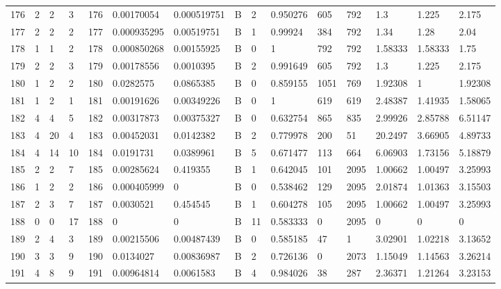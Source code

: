 \begin{latin}
\begin{longtable}{lllllllllllllll}
	176 & 2  & 2   & 3  & 176 & 0.00170054     & 0.000519751    & B & 2  & 0.950276 & 605  & 792  & 1.3     & 1.225   & 2.175   \\
	177 & 2  & 2   & 2  & 177 & 0.000935295    & 0.00519751     & B & 1  & 0.99924  & 384  & 792  & 1.34    & 1.28    & 2.04    \\
	178 & 1  & 1   & 2  & 178 & 0.000850268    & 0.00155925     & B & 0  & 1        & 792  & 792  & 1.58333 & 1.58333 & 1.75    \\
	179 & 2  & 2   & 3  & 179 & 0.00178556     & 0.0010395      & B & 2  & 0.991649 & 605  & 792  & 1.3     & 1.225   & 2.175   \\
	180 & 1  & 2   & 2  & 180 & 0.0282575      & 0.0865385      & B & 0  & 0.859155 & 1051 & 769  & 1.92308 & 1       & 1.92308 \\
	181 & 1  & 2   & 1  & 181 & 0.00191626     & 0.00349226     & B & 0  & 1        & 619  & 619  & 2.48387 & 1.41935 & 1.58065 \\
	182 & 4  & 4   & 5  & 182 & 0.00317873     & 0.00375327     & B & 0  & 0.632754 & 865  & 835  & 2.99926 & 2.85788 & 6.51147 \\
	183 & 4  & 20  & 4  & 183 & 0.00452031     & 0.0142382      & B & 2  & 0.779978 & 200  & 51   & 20.2497 & 3.66905 & 4.89733 \\
	184 & 4  & 14  & 10 & 184 & 0.0191731      & 0.0389961      & B & 5  & 0.671477 & 113  & 664  & 6.06903 & 1.73156 & 5.18879 \\
	185 & 2  & 2   & 7  & 185 & 0.00285624     & 0.419355       & B & 1  & 0.642045 & 101  & 2095 & 1.00662 & 1.00497 & 3.25993 \\
	186 & 1  & 2   & 2  & 186 & 0.000405999    & 0              & B & 0  & 0.538462 & 129  & 2095 & 2.01874 & 1.01363 & 3.15503 \\
	187 & 2  & 3   & 7  & 187 & 0.0030521      & 0.454545       & B & 1  & 0.604278 & 105  & 2095 & 1.00662 & 1.00497 & 3.25993 \\
	188 & 0  & 0   & 17 & 188 & 0              & 0              & B & 11 & 0.583333 & 0    & 2095 & 0       & 0       & 0       \\
	189 & 2  & 4   & 3  & 189 & 0.00215506     & 0.00487439     & B & 0  & 0.585185 & 47   & 1    & 3.02901 & 1.02218 & 3.13652 \\
	190 & 3  & 3   & 9  & 190 & 0.0134027      & 0.00836987     & B & 2  & 0.726136 & 0    & 2073 & 1.15049 & 1.14563 & 3.26214 \\
	191 & 4  & 8   & 9  & 191 & 0.00964814     & 0.0061583      & B & 4  & 0.984026 & 38   & 287  & 2.36371 & 1.21264 & 3.23153 \\

\end{longtable}
\end{latin}
